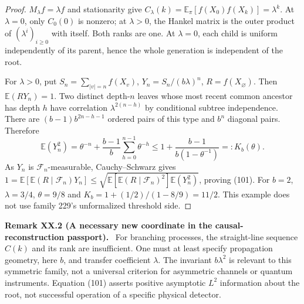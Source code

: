 \documentclass[11pt,a4paper,oneside]{book}
\newcommand{\statement}[3]{\par\medskip\noindent\textbf{#1 #2 (#3).}\ }
\begin{document}
\begin{proof}$M_\lambda f=\lambda f$ and stationarity give $C_\lambda(k)=\mathbb E_\pi[f(X_0)f(X_k)]=\lambda^k$. At $\lambda=0$, only $C_0(0)$ is nonzero; at $\lambda>0$, the Hankel matrix is the outer product of $(\lambda^i)_{i\ge0}$ with itself. Both ranks are one. At $\lambda=0$, each child is uniform independently of its parent, hence the whole generation is independent of the root.

For $\lambda>0$, put $S_n=\sum_{|v|=n}f(X_v)$, $Y_n=S_n/(b\lambda)^n$, $R=f(X_\varnothing)$. Then $\mathbb E(RY_n)=1$. Two distinct depth-$n$ leaves whose most recent common ancestor has depth $h$ have correlation $\lambda^{2(n-h)}$ by conditional subtree independence. There are $(b-1)b^{2n-h-1}$ ordered pairs of this type and $b^n$ diagonal pairs. Therefore
\[\mathbb E(Y_n^2)=\theta^{-n}+\frac{b-1}b\sum_{h=0}^{n-1}\theta^{-h}\le1+\frac{b-1}{b(1-\theta^{-1})}=:K_b(\theta).\]
As $Y_n$ is $\mathcal F_n$-measurable, Cauchy--Schwarz gives $1=\mathbb E[\mathbb E(R\mid\mathcal F_n)Y_n]\le\sqrt{\mathbb E[\mathbb E(R\mid\mathcal F_n)^2]\mathbb E(Y_n^2)}$, proving (101). For $b=2$, $\lambda=3/4$, $\theta=9/8$ and $K_b=1+(1/2)/(1-8/9)=11/2$. This example does not use family 229's unformalized threshold side.\end{proof}
\statement{Remark}{XX.2}{A necessary new coordinate in the causal-reconstruction passport} For branching processes, the straight-line sequence $C(k)$ and its rank are insufficient. One must at least specify propagation geometry, here $b$, and transfer coefficient $\lambda$. The invariant $b\lambda^2$ is relevant to this symmetric family, not a universal criterion for asymmetric channels or quantum instruments. Equation (101) asserts positive asymptotic $L^2$ information about the root, not successful operation of a specific physical detector.
\end{document}
